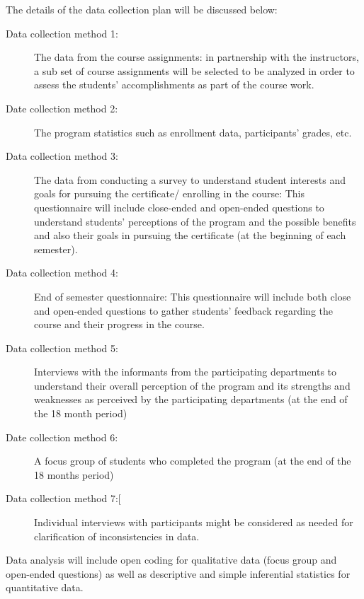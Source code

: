The details of the data collection plan will be discussed below:
\begin{description}

\item[Data collection method 1:] The data from the course assignments: in partnership with the instructors, a sub set of course assignments will be selected to be analyzed in order to assess the students’ accomplishments as part of the course work. 
\item[Date collection method 2:] The program statistics such as enrollment data, participants’ grades, etc. 
\item[Data collection method 3:] The data from conducting a survey to understand student interests and goals for pursuing the certificate/ enrolling in the course: This questionnaire will include close-ended and open-ended questions to understand students’ perceptions of the program and the possible benefits and also their goals in pursuing the certificate (at the beginning of each semester). 
\item[Data collection method 4:] End of semester questionnaire: This questionnaire will include both close and open-ended questions to gather students’ feedback regarding the course and their progress in the course. 
\item[Data collection method 5:] Interviews with the informants from the participating departments to understand their overall perception of the program and its strengths and weaknesses as perceived by the participating departments (at the end of the 18 month period) 
\item[Date collection method 6:] A focus group of students who completed the program (at the end of the 18 months period) 
\item[Data collection method 7:[] Individual interviews with participants might be considered as needed for clarification of inconsistencies in data. 
\end{description}
Data analysis will include open coding for qualitative data (focus group and open-ended questions) as well as descriptive and simple inferential statistics for quantitative data.  
